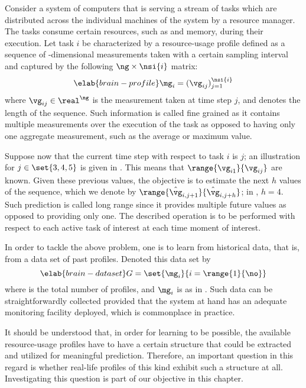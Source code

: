 Consider a system of computers that is serving a stream of tasks which are
distributed across the individual machines of the system by a resource manager.
The tasks consume certain resources, such as  and memory, during their
execution. Let task $i$ be characterized by a resource-usage profile defined as
a sequence of \ng-dimensional measurements taken with a certain sampling
interval and captured by the following $\ng \times \nsi{i}$ matrix:
\begin{equation} \elab{brain-profile}
  \mg_i = (\vg_{ij})_{j = 1}^\nsi{i}
\end{equation}
where $\vg_{ij} \in \real^\ng$ is the measurement taken at time step $j$, and
 denotes the length of the sequence. Such information is called fine
grained as it contains multiple measurements over the execution of the task as
opposed to having only one aggregate measurement, such as the average or maximum
value.

Suppose now that the current time step with respect to task $i$ is $j$; an
illustration for $j \in \set{3, 4, 5}$ is given in .
This means that $\range{\vg_{i1}}{\vg_{ij}}$ are known. Given these previous
values, the objective is to estimate the next $h$ values of the sequence, which
we denote by $\range{\hat{\vg}_{i, j + 1}}{\hat{\vg}_{i, j + h}}$; in
, $h = 4$. Such prediction is called long range since it
provides multiple future values as opposed to providing only one. The described
operation is to be performed with respect to each active task of interest at
each time moment of interest.

In order to tackle the above problem, one is to learn from historical data, that
is, from a data set of past profiles. Denoted this data set by
\begin{equation} \elab{brain-dataset}
  G = \set{\mg_i}{i = \range{1}{\no}}
\end{equation}
where \no is the total number of profiles, and $\mg_i$ is as in
. Such data can be straightforwardly collected provided that
the system at hand has an adequate monitoring facility deployed, which is
commonplace in practice.

It should be understood that, in order for learning to be possible, the
available resource-usage profiles have to have a certain structure that could be
extracted and utilized for meaningful prediction. Therefore, an important
question in this regard is whether real-life profiles of this kind exhibit such
a structure at all. Investigating this question is part of our objective in this
chapter.
